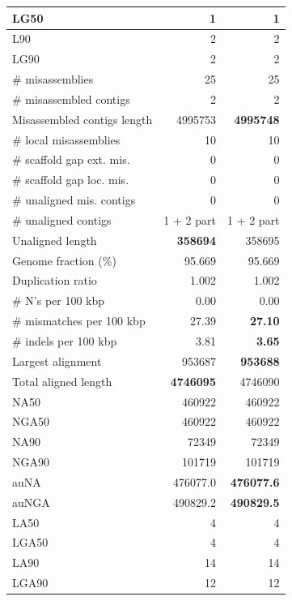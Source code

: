 \documentclass[12pt,a4paper]{article}
\begin{document}
\begin{table}[ht]
\begin{center}
\begin{tabular}{|l*{2}{|r}|}
LG50 & 1 & 1 \\ \hline
L90 & 2 & 2 \\ \hline
LG90 & 2 & 2 \\ \hline
\# misassemblies & 25 & 25 \\ \hline
\# misassembled contigs & 2 & 2 \\ \hline
Misassembled contigs length & 4995753 & {\bf 4995748} \\ \hline
\# local misassemblies & 10 & 10 \\ \hline
\# scaffold gap ext. mis. & 0 & 0 \\ \hline
\# scaffold gap loc. mis. & 0 & 0 \\ \hline
\# unaligned mis. contigs & 0 & 0 \\ \hline
\# unaligned contigs & 1 + 2 part & 1 + 2 part \\ \hline
Unaligned length & {\bf 358694} & 358695 \\ \hline
Genome fraction (\%) & 95.669 & 95.669 \\ \hline
Duplication ratio & 1.002 & 1.002 \\ \hline
\# N's per 100 kbp & 0.00 & 0.00 \\ \hline
\# mismatches per 100 kbp & 27.39 & {\bf 27.10} \\ \hline
\# indels per 100 kbp & 3.81 & {\bf 3.65} \\ \hline
Largest alignment & 953687 & {\bf 953688} \\ \hline
Total aligned length & {\bf 4746095} & 4746090 \\ \hline
NA50 & 460922 & 460922 \\ \hline
NGA50 & 460922 & 460922 \\ \hline
NA90 & 72349 & 72349 \\ \hline
NGA90 & 101719 & 101719 \\ \hline
auNA & 476077.0 & {\bf 476077.6} \\ \hline
auNGA & 490829.2 & {\bf 490829.5} \\ \hline
LA50 & 4 & 4 \\ \hline
LGA50 & 4 & 4 \\ \hline
LA90 & 14 & 14 \\ \hline
LGA90 & 12 & 12 \\ \hline
\end{tabular}
\end{center}
\end{table}
\end{document}
